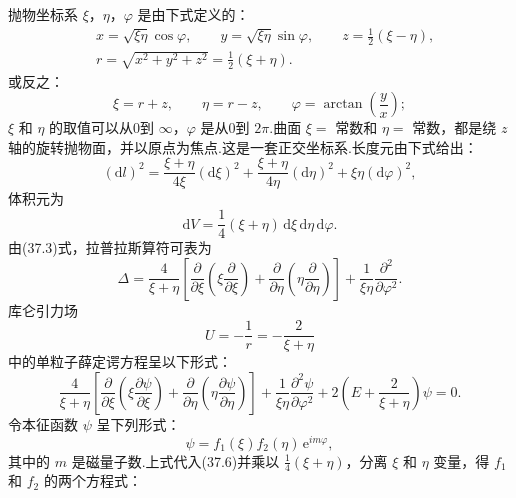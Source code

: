 抛物坐标系 $\xi$，$\eta$，$\varphi$ 是由下式定义的：
\begin{equation}
\begin{aligned}
  &x=\sqrt{\xi\eta}\cos\varphi,\qquad
  y=\sqrt{\xi\eta}\sin\varphi,\qquad
  z=\frac{1}{2}(\xi-\eta),\\
  &r=\sqrt{x^2+y^2+z^2}=\frac{1}{2}(\xi+\eta).
\end{aligned}
\end{equation}
或反之：
\begin{equation}
  \xi=r+z,\qquad\eta=r-z,\qquad
  \varphi=\arctan\left(\frac{y}{x}\right);
\end{equation}
$\xi$ 和 $\eta$ 的取值可以从0到 $\infty$，$\varphi$ 是从0到 $2\pi$.曲面 $\xi=$ 常数和 $\eta=$ 常数，都是绕 $z$ 轴的旋转抛物面，并以原点为焦点.这是一套正交坐标系.长度元由下式给出：
\begin{equation}
  (\mathrm{d}l)^2=\frac{\xi+\eta}{4\xi}(\mathrm{d}\xi)^2
  +\frac{\xi+\eta}{4\eta}(\mathrm{d}\eta)^2+\xi\eta(\mathrm{d}\varphi)^2,
\end{equation}
体积元为
\begin{equation}
  \mathrm{d}V=\frac{1}{4}(\xi+\eta)\,\mathrm{d}\xi\,\mathrm{d}\eta\,\mathrm{d}\varphi.
\end{equation}
由(37.3)式，拉普拉斯算符可表为
\begin{equation}
  \Delta=\frac{4}{\xi+\eta}\left[\frac{\partial}{\partial\xi}
  \left(\xi\frac{\partial}{\partial\xi}\right)
  +\frac{\partial}{\partial\eta}
  \left(\eta\frac{\partial}{\partial\eta}\right)\right]
  +\frac{1}{\xi\eta}\frac{\partial^2}{\partial\varphi^2}.
\end{equation}
库仑引力场
\begin{equation*}
  U=-\frac{1}{r}=-\frac{2}{\xi+\eta}
\end{equation*}
中的单粒子薛定谔方程呈以下形式：
\begin{equation}
  \frac{4}{\xi+\eta}\left[\frac{\partial}{\partial\xi}
  \left(\xi\frac{\partial\psi}{\partial\xi}\right)
  +\frac{\partial}{\partial\eta}
  \left(\eta\frac{\partial\psi}{\partial\eta}\right)\right]
  +\frac{1}{\xi\eta}\frac{\partial^2\psi}{\partial\varphi^2}
  +2\left(E+\frac{2}{\xi+\eta}\right)\psi=0.
\end{equation}
令本征函数 $\psi$ 呈下列形式：
\begin{equation}
  \psi=f_1(\xi)f_2(\eta)\,\mathrm{e}^{im\varphi},
\end{equation}
其中的 $m$ 是磁量子数.上式代入(37.6)并乘以 $\frac{1}{4}(\xi+\eta)$，分离 $\xi$ 和 $\eta$ 变量，得 $f_1$ 和 $f_2$ 的两个方程式：
